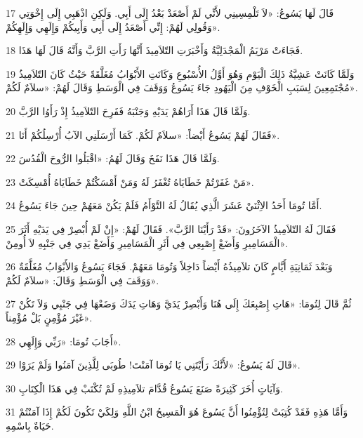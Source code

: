 \par 17 قَالَ لَهَا يَسُوعُ: «لاَ تَلْمِسِينِي لأَنِّي لَمْ أَصْعَدْ بَعْدُ إِلَى أَبِي. وَلَكِنِ اذْهَبِي إِلَى إِخْوَتِي وَقُولِي لَهُمْ: إِنِّي أَصْعَدُ إِلَى أَبِي وَأَبِيكُمْ وَإِلَهِي وَإِلَهِكُمْ».
\par 18 فَجَاءَتْ مَرْيَمُ الْمَجْدَلِيَّةُ وَأَخْبَرَتِ التّلاَمِيذَ أَنَّهَا رَأَتِ الرَّبَّ وَأَنَّهُ قَالَ لَهَا هَذَا.
\par 19 وَلَمَّا كَانَتْ عَشِيَّةُ ذَلِكَ الْيَوْمِ وَهُوَ أَوَّلُ الأُسْبُوعِ وَكَانَتِ الأَبْوَابُ مُغَلَّقَةً حَيْثُ كَانَ التّلاَمِيذُ مُجْتَمِعِينَ لِسَبَبِ الْخَوْفِ مِنَ الْيَهُودِ جَاءَ يَسُوعُ وَوَقَفَ فِي الْوَسَطِ وَقَالَ لَهُمْ: «سلاَمٌ لَكُمْ».
\par 20 وَلَمَّا قَالَ هَذَا أَرَاهُمْ يَدَيْهِ وَجَنْبَهُ فَفَرِحَ التّلاَمِيذُ إِذْ رَأَوُا الرَّبَّ.
\par 21 فَقَالَ لَهُمْ يَسُوعُ أَيْضاً: «سلاَمٌ لَكُمْ. كَمَا أَرْسَلَنِي الآبُ أُرْسِلُكُمْ أَنَا».
\par 22 وَلَمَّا قَالَ هَذَا نَفَخَ وَقَالَ لَهُمُ: «اقْبَلُوا الرُّوحَ الْقُدُسَ.
\par 23 مَنْ غَفَرْتُمْ خَطَايَاهُ تُغْفَرُ لَهُ وَمَنْ أَمْسَكْتُمْ خَطَايَاهُ أُمْسِكَتْ».
\par 24 أَمَّا تُومَا أَحَدُ الاِثْنَيْ عَشَرَ الَّذِي يُقَالُ لَهُ التَّوْأَمُ فَلَمْ يَكُنْ مَعَهُمْ حِينَ جَاءَ يَسُوعُ.
\par 25 فَقَالَ لَهُ التّلاَمِيذُ الآخَرُونَ: «قَدْ رَأَيْنَا الرَّبَّ». فَقَالَ لَهُمْ: «إِنْ لَمْ أُبْصِرْ فِي يَدَيْهِ أَثَرَ الْمَسَامِيرِ وَأَضَعْ إِصْبِعِي فِي أَثَرِ الْمَسَامِيرِ وَأَضَعْ يَدِي فِي جَنْبِهِ لاَ أُومِنْ».
\par 26 وَبَعْدَ ثَمَانِيَةِ أَيَّامٍ كَانَ تلاَمِيذُهُ أَيْضاً دَاخِلاً وَتُومَا مَعَهُمْ. فَجَاءَ يَسُوعُ وَالأَبْوَابُ مُغَلَّقَةٌ وَوَقَفَ فِي الْوَسَطِ وَقَالَ: «سلاَمٌ لَكُمْ».
\par 27 ثُمَّ قَالَ لِتُومَا: «هَاتِ إِصْبِعَكَ إِلَى هُنَا وَأَبْصِرْ يَدَيَّ وَهَاتِ يَدَكَ وَضَعْهَا فِي جَنْبِي وَلاَ تَكُنْ غَيْرَ مُؤْمِنٍ بَلْ مُؤْمِناً».
\par 28 أَجَابَ تُومَا: «رَبِّي وَإِلَهِي».
\par 29 قَالَ لَهُ يَسُوعُ: «لأَنَّكَ رَأَيْتَنِي يَا تُومَا آمَنْتَ! طُوبَى لِلَّذِينَ آمَنُوا وَلَمْ يَرَوْا».
\par 30 وَآيَاتٍ أُخَرَ كَثِيرَةً صَنَعَ يَسُوعُ قُدَّامَ تلاَمِيذِهِ لَمْ تُكْتَبْ فِي هَذَا الْكِتَابِ.
\par 31 وَأَمَّا هَذِهِ فَقَدْ كُتِبَتْ لِتُؤْمِنُوا أَنَّ يَسُوعَ هُوَ الْمَسِيحُ ابْنُ اللَّهِ وَلِكَيْ تَكُونَ لَكُمْ إِذَا آمَنْتُمْ حَيَاةٌ بِاسْمِهِ.

